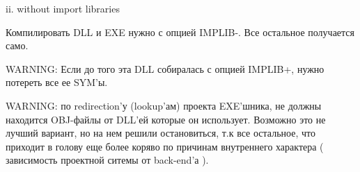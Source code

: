              ii. without import libraries

                 Компилировать DLL и EXE нужно с опцией IMPLIB-.
                 Все остальное получается само.

                 WARNING: Если до того эта DLL собиралась с опцией IMPLIB+,
                 нужно потереть все ее SYM'ы.


             WARNING: по redirection'у (lookup'ам) проекта EXE'шника, не должны
             находится OBJ-файлы от DLL'ей которые он использует. Возможно это не лучший
             вариант, но на нем решили остановиться, т.к все остальное, что приходит в голову
             еще более коряво по причинам внутреннего характера ( зависимость проектной ситемы
             от back-end'а ).



\fi
